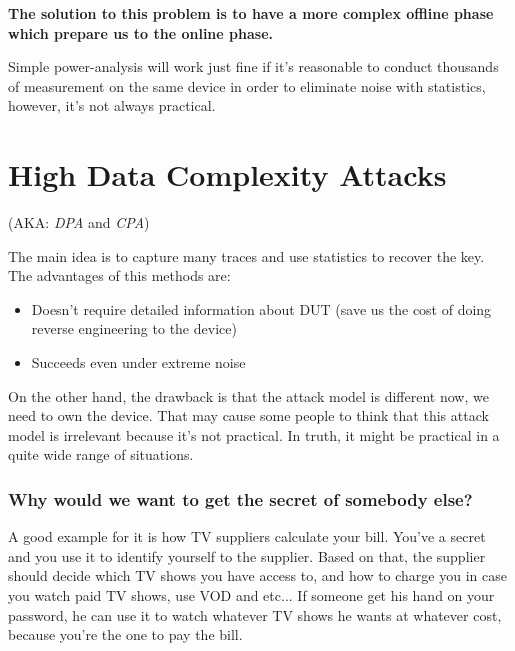 \textbf{The solution to this problem is to have a more complex offline phase which prepare us to the online phase.}

Simple power-analysis will work just fine if it's reasonable to conduct thousands of measurement on the same device in order to eliminate noise with statistics, however, it's not always practical.

\section{High Data Complexity Attacks}
(AKA: \textit{DPA} and \textit{CPA})

The main idea is to capture many traces and use statistics to recover the key.
The advantages of this methods are:
\begin{itemize}
\item Doesn't require detailed information about DUT (save us the cost of doing reverse engineering to the device)
\item Succeeds even under extreme noise
\end{itemize}
On the other hand, the drawback is that the attack model is different now, we need to own the device. That may cause some people to think that this attack model is irrelevant because it's not practical. In truth, it might be practical in a quite wide range of situations.
\subsubsection{Why would we want to get the secret of somebody else?}
A good example for it is how TV suppliers calculate your bill. You've a secret and you use it to identify yourself to the supplier. Based on that, the supplier should decide which TV shows you have access to, and how to charge you in case you watch paid TV shows, use VOD and etc... If someone get his hand on your password, he can use it to watch whatever TV shows he wants at whatever cost, because you're the one to pay the bill.
